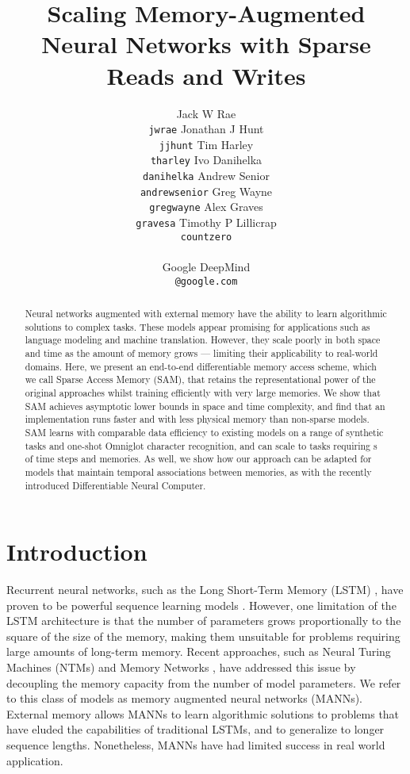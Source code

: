 \documentclass{article}
\title{Scaling Memory-Augmented Neural Networks with Sparse Reads and Writes}
\author{
Jack W Rae\footnotemark[1] \\
\texttt{jwrae}
\And
Jonathan J Hunt\footnotemark[1] \\
\texttt{jjhunt}
\And
Tim Harley\\
\texttt{tharley}
\And
Ivo Danihelka \\
\texttt{danihelka}
\And
Andrew Senior \\
\texttt{andrewsenior}
\And
Greg Wayne \\
\texttt{gregwayne}
\And
Alex Graves \\
\texttt{gravesa}
\And
Timothy P Lillicrap \\
\texttt{countzero}
\\
\\
\hspace{-8.3cm}
Google DeepMind \\
\hspace{-8.3cm}
\texttt{@google.com}
}
\begin{document}
\maketitle

\renewcommand{\thefootnote}{\fnsymbol{footnote}}



\begin{abstract}
Neural networks augmented with external memory have the ability to learn algorithmic solutions to complex tasks. These models appear promising for applications such as language modeling and machine translation. However, they scale poorly in both space and time as the amount of memory grows --- limiting their applicability to real-world domains. Here, we present an end-to-end differentiable memory access scheme, which we call Sparse Access Memory (SAM), that retains the representational power of the original approaches whilst training efficiently with very large memories. We show that SAM achieves asymptotic lower bounds in space and time complexity, and find that an implementation runs  faster and with  less physical memory than non-sparse models. SAM learns with comparable data efficiency to existing models on a range of synthetic tasks and one-shot Omniglot character recognition, and can scale to tasks requiring s of time steps and memories. As well, we show how our approach can be adapted for models that maintain temporal associations between memories, as with the recently introduced Differentiable Neural Computer.




\end{abstract}


\section{Introduction}








Recurrent neural networks, such as the Long Short-Term Memory (LSTM) \cite{hochreiter1997long}, have proven to be powerful sequence learning models \cite{graves2013speech, sutskever2014}. However, one limitation of the LSTM architecture is that the number of parameters grows proportionally to the square of the size of the memory, making them unsuitable for problems requiring large amounts of long-term memory. Recent approaches, such as Neural Turing Machines (NTMs) \cite{graves2014neural} and Memory Networks \cite{weston2014memory}, have addressed this issue by decoupling the memory capacity from the number of model parameters. We refer to this class of models as memory augmented neural networks (MANNs). External memory allows MANNs to learn algorithmic solutions to problems that have eluded the capabilities of traditional LSTMs, and to generalize to longer sequence lengths. Nonetheless, MANNs have had limited success in real world application.
\end{document}

